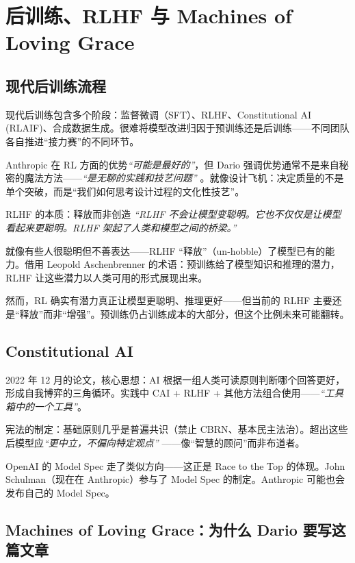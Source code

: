 \section{后训练、RLHF 与 Machines of Loving Grace}

\subsection{现代后训练流程}

现代后训练包含多个阶段：监督微调（SFT）、RLHF、Constitutional AI (RLAIF)、合成数据生成。很难将模型改进归因于预训练还是后训练——不同团队各自推进``接力赛''的不同环节。

Anthropic 在 RL 方面的优势\textit{``可能是最好的''}，但 Dario 强调优势通常不是来自秘密的魔法方法——\textit{``是无聊的实践和技艺问题''} 。就像设计飞机：决定质量的不是单个突破，而是``我们如何思考设计过程的文化性技艺''。

\begin{importantbox}{RLHF 的本质：释放而非创造}
\textit{``RLHF 不会让模型变聪明。它也不仅仅是让模型看起来更聪明。RLHF 架起了人类和模型之间的桥梁。''}

就像有些人很聪明但不善表达——RLHF ``释放''（un-hobble）了模型已有的能力。借用 Leopold Aschenbrenner 的术语：预训练给了模型知识和推理的潜力，RLHF 让这些潜力以人类可用的形式展现出来。

然而，RL 确实有潜力真正让模型更聪明、推理更好——但当前的 RLHF 主要还是``释放''而非``增强''。预训练仍占训练成本的大部分，但这个比例未来可能翻转。
\end{importantbox}

\subsection{Constitutional AI}

2022 年 12 月的论文，核心思想：AI 根据一组人类可读原则判断哪个回答更好，形成自我博弈的三角循环。实践中 CAI + RLHF + 其他方法组合使用——\textit{``工具箱中的一个工具''}。

宪法的制定：基础原则几乎是普遍共识（禁止 CBRN、基本民主法治）。超出这些后模型应\textit{``更中立，不偏向特定观点''} ——像``智慧的顾问''而非布道者。

OpenAI 的 Model Spec 走了类似方向——这正是 Race to the Top 的体现。John Schulman（现在在 Anthropic）参与了 Model Spec 的制定。Anthropic 可能也会发布自己的 Model Spec。

\subsection{Machines of Loving Grace：为什么 Dario 要写这篇文章}

